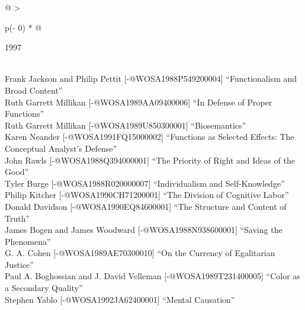 \documentclass[
  10pt,
  letterpaper,
  DIV=11,
  numbers=noendperiod,
  twoside]{scrartcl}
\begin{document}
\begin{longtable}[]{@{}
  >{\raggedright\arraybackslash}p{(\columnwidth - 0\tabcolsep) * }@{}}

\caption{\label{tbl-top-ten-1988}Most cited articles published less than
ten years ago as of 1997.}

\tabularnewline

\toprule\noalign{}
\begin{minipage}[b]{\linewidth}\raggedright
1997
\end{minipage} \\
\midrule\noalign{}
\endhead
\bottomrule\noalign{}
\endlastfoot
Frank Jackson and Philip Pettit {[}-@WOSA1988P549200004{]}
``Functionalism and Broad Content'' \\
Ruth Garrett Millikan {[}-@WOSA1989AA09400006{]} ``In Defense of Proper
Functions'' \\
Ruth Garrett Millikan {[}-@WOSA1989U850300001{]} ``Biosemantics'' \\
Karen Neander {[}-@WOSA1991FQ15000002{]} ``Functions as Selected
Effects: The Conceptual Analyst's Defense'' \\
John Rawls {[}-@WOSA1988Q394000001{]} ``The Priority of Right and Ideas
of the Good'' \\
Tyler Burge {[}-@WOSA1988R020000007{]} ``Individualism and
Self-Knowledge'' \\
Philip Kitcher {[}-@WOSA1990CH71200001{]} ``The Division of Cognitive
Labor'' \\
Donald Davidson {[}-@WOSA1990EQ84600001{]} ``The Structure and Content
of Truth'' \\
James Bogen and James Woodward {[}-@WOSA1988N938600001{]} ``Saving the
Phenomena'' \\
G. A. Cohen {[}-@WOSA1989AE70300010{]} ``On the Currency of Egalitarian
Justice'' \\
Paul A. Boghossian and J. David Velleman {[}-@WOSA1989T231400005{]}
``Color as a Secondary Quality'' \\
Stephen Yablo {[}-@WOSA1992JA62400001{]} ``Mental Causation'' \\

\end{longtable}
\end{document}
